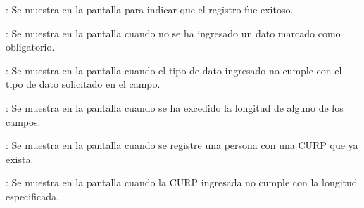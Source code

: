\begin{Citemize}
	\item {}: Se muestra en la pantalla  para indicar que el registro fue exitoso.
	\item {}: Se muestra en la pantalla  cuando no se ha ingresado un dato marcado como obligatorio.
	\item {}: Se muestra en la pantalla  cuando el tipo de dato ingresado no cumple con el tipo de dato solicitado en el campo.
	\item {}: Se muestra en la pantalla  cuando se ha excedido la longitud de alguno de los campos.
	\item {}: Se muestra en la pantalla  cuando se registre una persona con una CURP que ya exista.
	\item {}: Se muestra en la pantalla  cuando la CURP ingresada no cumple con la longitud especificada.
\end{Citemize}
